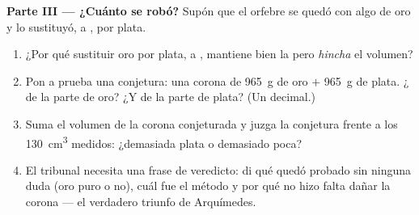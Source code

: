 \begin{problem}
\medskip\noindent\textbf{Parte III --- ¿Cuánto se robó?}
Supón que el orfebre se quedó con algo de oro y lo sustituyó,
 a , por plata.
\begin{enumerate}[resume]
  \item ¿Por qué sustituir oro por plata,  a ,
        mantiene bien la  pero \emph{hincha} el volumen?
  \item Pon a prueba una conjetura: una corona de \qty{965}{g} de oro
        $+$ \qty{965}{g} de plata. ¿ de la parte de oro? ¿Y
        de la parte de plata? (Un decimal.)
  \item Suma el volumen de la corona conjeturada y juzga la
        conjetura frente a los \qty{130}{cm^3} medidos: ¿demasiada
        plata o demasiado poca?
  \item El tribunal necesita una frase de veredicto: di qué quedó
        probado sin ninguna duda (oro puro o no), cuál fue el método y
        por qué no hizo falta dañar la corona --- el verdadero triunfo
        de Arquímedes.
\end{enumerate}
\end{problem}
